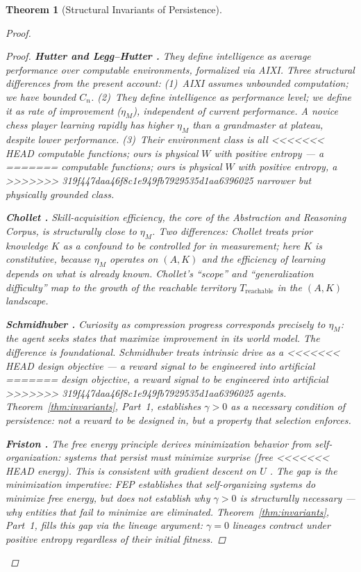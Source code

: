 \documentclass[11pt]{article}
\newtheorem{theorem}{Theorem}
\theoremstyle{definition}
\theoremstyle{remark}
\begin{document}
\begin{theorem}[Structural Invariants of Persistence]
\begin{proof}
\begin{proof}
\textbf{Hutter \cite{Hutter2005} and Legg--Hutter \cite{LeggHutter2007}.}
They define intelligence as average performance over computable
environments, formalized via AIXI. Three structural differences from the
present account: (1)~AIXI assumes unbounded computation; we have bounded
$C_n$. (2)~They define intelligence as performance level; we define it as
rate of improvement ($\eta_M$), independent of current performance. A
novice chess player learning rapidly has higher $\eta_M$ than a grandmaster
at plateau, despite lower performance. (3)~Their environment class is all
<<<<<<< HEAD
computable functions; ours is physical $W$ with positive entropy --- a
=======
computable functions; ours is physical $W$ with positive entropy, a
>>>>>>> 319f447daa46f8c1e949fb7929535d1aa6396025
narrower but physically grounded class.

\textbf{Chollet \cite{Chollet2019}.}
Skill-acquisition efficiency, the core of the Abstraction and Reasoning
Corpus, is structurally close to $\eta_M$. Two differences: Chollet
treats prior knowledge $K$ as a confound to be controlled for in
measurement; here $K$ is constitutive, because $\eta_M$ operates on
$(A, K)$ and the efficiency of learning depends on what is already known.
Chollet's ``scope'' and ``generalization difficulty'' map to the growth
of the reachable territory $T_{\mathrm{reachable}}$ in the $(A, K)$
landscape.

\textbf{Schmidhuber \cite{Schmidhuber2010}.}
Curiosity as compression progress corresponds precisely to $\eta_M$:
the agent seeks states that maximize improvement in its world model. The
difference is foundational. Schmidhuber treats intrinsic drive as a
<<<<<<< HEAD
design objective --- a reward signal to be engineered into artificial
=======
design objective, a reward signal to be engineered into artificial
>>>>>>> 319f447daa46f8c1e949fb7929535d1aa6396025
agents. Theorem~\ref{thm:invariants}, Part~1, establishes $\gamma > 0$ as a
necessary condition of persistence: not a reward to be designed in, but a
property that selection enforces.

\textbf{Friston \cite{Friston2010, Friston2017}.}
The free energy principle derives minimization behavior from
self-organization: systems that persist must minimize surprise (free
<<<<<<< HEAD
energy). This is consistent with gradient descent on $U$
\cite{McCarthy2026d}. The gap is the minimization \emph{imperative}:
FEP establishes that self-organizing systems \emph{do} minimize free
energy, but does not establish why $\gamma > 0$ is structurally necessary ---
why entities that fail to minimize are eliminated. Theorem~\ref{thm:invariants},
Part~1, fills this gap via the lineage argument: $\gamma = 0$ lineages
contract under positive entropy regardless of their initial fitness.


\end{proof}
\end{proof}
\end{theorem}
\end{document}
